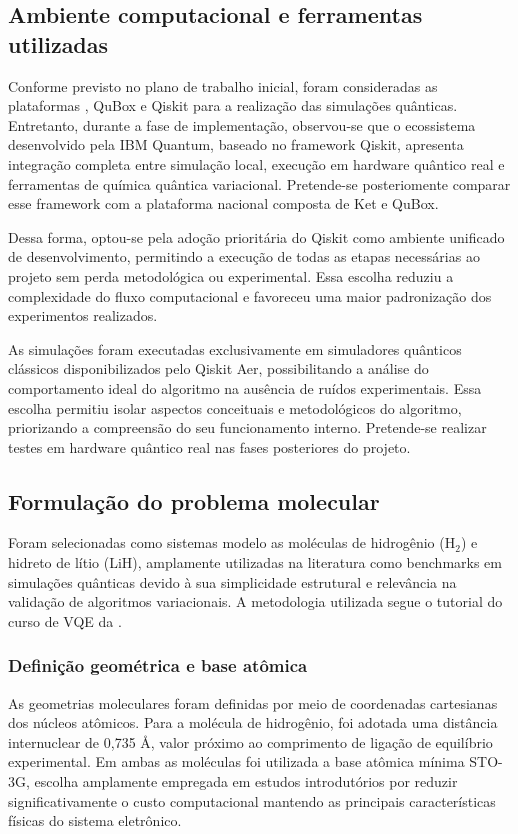 \subsection{Ambiente computacional e ferramentas utilizadas}

Conforme previsto no plano de trabalho inicial, foram consideradas as 
plataformas \textcite{quantumket}, QuBox e Qiskit para a realização das simulações quânticas. 
Entretanto, durante a fase de implementação, observou-se que o ecossistema 
desenvolvido pela IBM Quantum, baseado no framework Qiskit, apresenta 
integração completa entre simulação local, execução em hardware quântico 
real e ferramentas de química quântica variacional. Pretende-se posteriomente comparar esse framework com a plataforma nacional composta de Ket e QuBox.

Dessa forma, optou-se pela adoção prioritária do Qiskit como ambiente 
unificado de desenvolvimento, permitindo a execução de todas as etapas 
necessárias ao projeto sem perda metodológica ou experimental. Essa escolha 
reduziu a complexidade do fluxo computacional e favoreceu uma maior 
padronização dos experimentos realizados.

As simulações foram executadas exclusivamente em simuladores quânticos
clássicos disponibilizados pelo Qiskit Aer, possibilitando a análise
do comportamento ideal do algoritmo na ausência de ruídos experimentais.
Essa escolha permitiu isolar aspectos conceituais e metodológicos do
algoritmo, priorizando a compreensão do seu funcionamento interno. Pretende-se realizar testes em hardware quântico real nas fases posteriores do projeto.

\subsection{Formulação do problema molecular}

Foram selecionadas como sistemas modelo as moléculas de hidrogênio (H$_2$) e 
hidreto de lítio (LiH), amplamente utilizadas na literatura como benchmarks 
em simulações quânticas devido à sua simplicidade estrutural e relevância na 
validação de algoritmos variacionais. A metodologia utilizada segue o tutorial do curso de VQE da \textcite{ibm_vqe_course}.

\subsubsection{Definição geométrica e base atômica}

As geometrias moleculares foram definidas por meio de coordenadas 
cartesianas dos núcleos atômicos. Para a molécula de hidrogênio, foi adotada 
uma distância internuclear de 0,735 Å, valor próximo ao comprimento de 
ligação de equilíbrio experimental. 
Em ambas as moléculas foi utilizada a base atômica mínima STO-3G, escolha 
amplamente empregada em estudos introdutórios por reduzir significativamente 
o custo computacional mantendo as principais características físicas do 
sistema eletrônico.

